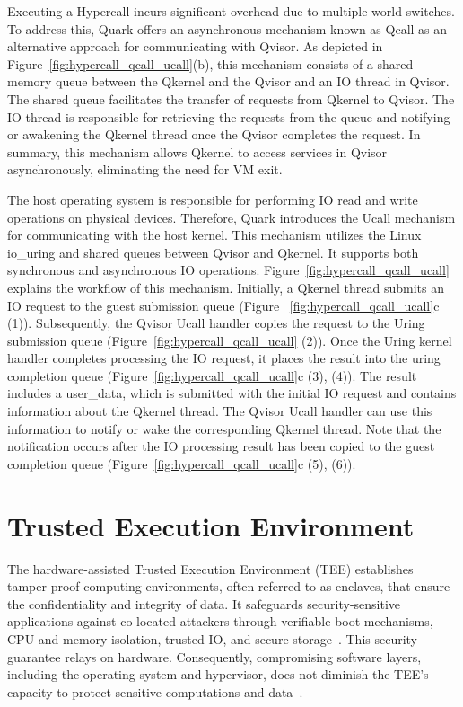 Executing a Hypercall incurs significant overhead due to multiple world switches. To address this, Quark offers an asynchronous mechanism known as Qcall as an alternative approach for communicating with Qvisor. As depicted in Figure~\ref{fig:hypercall_qcall_ucall}(b), this mechanism consists of a 
shared memory queue between the Qkernel and the Qvisor and an IO thread in Qvisor. The shared queue facilitates the transfer of requests from Qkernel to Qvisor. The IO thread is responsible for retrieving the requests from the queue and notifying or awakening the Qkernel thread once the Qvisor completes the request. In summary,   
this mechanism allows Qkernel to access services in Qvisor asynchronously, eliminating the need for VM exit. 

The host operating system is responsible for performing IO read and write operations on physical devices. Therefore, Quark introduces the Ucall mechanism for communicating with the host kernel. This mechanism utilizes the Linux io\_uring and shared queues between Qvisor and Qkernel. It supports
both synchronous and asynchronous IO operations. Figure~\ref{fig:hypercall_qcall_ucall} explains the workflow of this mechanism. Initially, a Qkernel thread submits an IO request to the guest submission queue (Figure ~\ref{fig:hypercall_qcall_ucall}c (1)). Subsequently, the Qvisor Ucall handler copies the request to the Uring submission queue 
(Figure~\ref{fig:hypercall_qcall_ucall} (2)). Once the Uring kernel handler completes processing the IO request, it places the result into the uring completion queue (Figure~\ref{fig:hypercall_qcall_ucall}c (3), (4)). The result includes a user\_data, which is submitted with the initial IO 
request and contains information about the Qkernel thread. The Qvisor Ucall handler can use this information to notify or wake the corresponding Qkernel thread. Note that the notification occurs after the IO processing result has been copied to the guest completion 
queue (Figure~\ref{fig:hypercall_qcall_ucall}c (5), (6)).

\section{Trusted Execution Environment}

The hardware-assisted Trusted Execution Environment (TEE) establishes tamper-proof computing environments, often referred to as enclaves, that ensure the confidentiality and integrity of data. It safeguards security-sensitive applications against co-located attackers through verifiable boot mechanisms, 
CPU and memory isolation, trusted IO, and secure storage~\cite*{Hardware-supported-TEE}. This security guarantee relays on hardware. Consequently, compromising software layers, including the operating system and hypervisor, does not diminish the TEE's capacity to protect sensitive 
computations and data~\cite*{7345265}.


